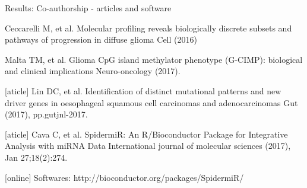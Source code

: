 \documentclass[slidestop,compress,11pt,xcolor=dvipsnames]{beamer}
\begin{document}
\begin{frame}{Results: Co-authorship - articles and software}
\begin{thebibliography}{10}
\tiny


\beamertemplatearticlebibitems
{}
Ceccarelli M, et al.
\newblock Molecular profiling reveals biologically discrete subsets and pathways of progression in diffuse glioma
\newblock Cell (2016)

\beamertemplatearticlebibitems
{}
Malta TM, et al.
\newblock Glioma CpG island methylator phenotype (G-CIMP): biological and clinical implications
\newblock Neuro-oncology (2017).

[aticle]
 Lin DC, et al.
\newblock Identification of distinct mutational patterns and new driver genes in oesophageal squamous cell carcinomas and adenocarcinomas
\newblock Gut (2017), pp.gutjnl-2017.

[aticle]
Cava C, et al.
\newblock SpidermiR: An R/Bioconductor Package for Integrative Analysis with miRNA Data
\newblock International journal of molecular sciences (2017), Jan 27;18(2):274.


[online]
  Softwares:
  \newblock 	http://bioconductor.org/packages/SpidermiR/
 \end{thebibliography}
\end{frame}
\end{document}
